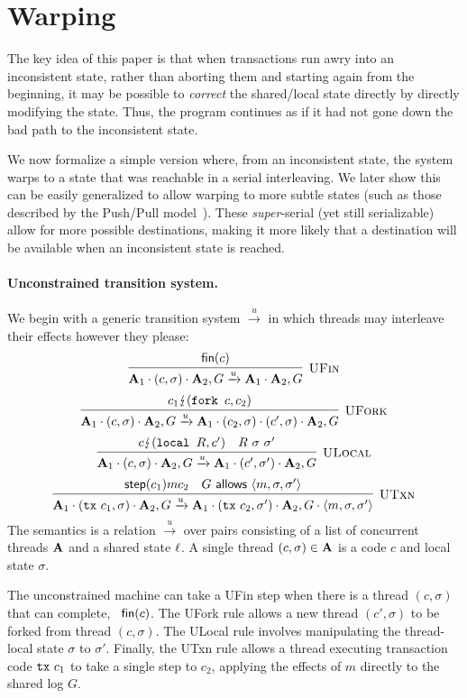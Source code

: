 \section{Warping}

The key idea of this paper is that when transactions run
awry into an inconsistent state, rather than aborting them and
starting again from the beginning, it may be possible to
\emph{correct} the shared/local state directly by directly
modifying the state. Thus, the program continues as if it had not
gone down the bad path to the inconsistent state.

We now formalize a simple version where, from an inconsistent state,
the system warps to a state that was reachable in a serial
interleaving. We later show this can be easily generalized to allow
warping to more subtle states (such as those described by the
Push/Pull model~\cite{}). These \emph{super}-serial (yet still
serializable) allow for more possible destinations, making it more
likely that a destination will be available when an inconsistent state
is reached.


\paragraph{Unconstrained transition system.}

We begin with a generic transition system $\xrightarrow{u}$ in which threads may
interleave their effects however they please:
$$
\infer[\text{\sc UFin}]{ 
  \As_1 \cdot (c,\sigma) \cdot \As_2, G  \xrightarrow{u}
  \As_1 \cdot \As_2, G 
}{
  \nothing{c}
}
$$
$$
\infer[\text{\sc UFork}]{ 
  \As_1 \cdot (c,\sigma) \cdot \As_2, G  \xrightarrow{u}
  \As_1 \cdot (c_2,\sigma) \cdot (c',\sigma) \cdot \As_2, G 
}{
  \tstep{c_1}{\fork{c}}{c_2}
}
$$
$$
\infer[\text{\sc ULocal}]{ 
  \As_1 \cdot (c,\sigma) \cdot \As_2, G  \xrightarrow{u}
  \As_1 \cdot (c',\sigma') \cdot \As_2, G 
}{
  \tstep{c}{\local{R}}{c'} & R\ \sigma\ \sigma'
}
$$
$$
\infer[\text{\sc UTxn}]{ 
  \As_1 \cdot (\tx{c_1},\sigma) \cdot \As_2, G  \xrightarrow{u}
  \As_1 \cdot (\tx{c_2},\sigma') \cdot \As_2, G\cdot \langle m,\sigma,\sigma' \rangle
}{
  \step{c_1}{m}{c_2} &
  G \allows \langle m,\sigma,\sigma' \rangle
}
$$
The semantics is a relation
$\xrightarrow{u}$ over pairs consisting of a list of concurrent
threads $\mathbf{A}$ and a shared state $\ell$. 
A single thread $(c,\sigma)\in\mathbf{A}$ is a code $c$ and local state $\sigma$. 

The unconstrained machine can take a {\sc UFin} step when there is a thread
$(c,\sigma)$ that can complete, \ie~$\textsf{fin}(c)$.
%
The {\sc UFork} rule allows a new thread
$(c',\sigma)$ to be forked from thread $(c,\sigma)$.
%
The {\sc ULocal} rule involves manipulating the thread-local state
$\sigma$ to $\sigma'$.
%
Finally, the {\sc UTxn} rule allows a thread executing transaction
code $\texttt{tx}\ c_1$ to take a single step to $c_2$, applying the effects
of $m$ directly to the shared log $G$.

